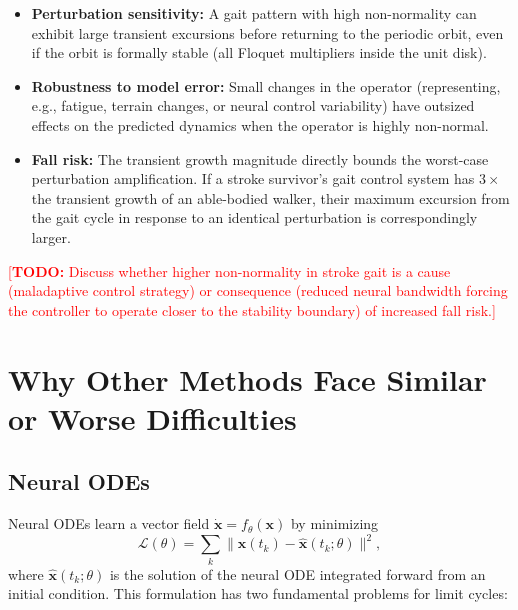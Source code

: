 \documentclass[12pt]{article}
\newcommand{\norm}[1]{\lVert #1 \rVert}
\newcommand{\todo}[1]{\textcolor{red}{[\textbf{TODO:} #1]}}
\begin{document}
\begin{itemize}
  \item \textbf{Perturbation sensitivity:} A gait pattern with high
  non-normality can exhibit large transient excursions before returning
  to the periodic orbit, even if the orbit is formally stable (all
  Floquet multipliers inside the unit disk).
  \item \textbf{Robustness to model error:} Small changes in the operator
  (representing, e.g., fatigue, terrain changes, or neural control
  variability) have outsized effects on the predicted dynamics when the
  operator is highly non-normal.
  \item \textbf{Fall risk:} The transient growth magnitude directly
  bounds the worst-case perturbation amplification. If a stroke
  survivor's gait control system has $3\times$ the transient growth
  of an able-bodied walker, their maximum excursion from the gait
  cycle in response to an identical perturbation is correspondingly
  larger.
\end{itemize}

\todo{Discuss whether higher non-normality in stroke gait is a cause
(maladaptive control strategy) or consequence (reduced neural bandwidth
forcing the controller to operate closer to the stability boundary) of
increased fall risk.}

\section{Why Other Methods Face Similar or Worse Difficulties}
\label{sec:alternatives}

\subsection{Neural ODEs}
\label{sec:neural_odes}

Neural ODEs learn a vector field $\dot{\bm{x}} = f_\theta(\bm{x})$ by
minimizing
\begin{equation}
  \mathcal{L}(\theta) = \sum_k \norm{\bm{x}(t_k) - \hat{\bm{x}}(t_k;\theta)}^2,
  \label{eq:node_loss}
\end{equation}
where $\hat{\bm{x}}(t_k;\theta)$ is the solution of the neural ODE
integrated forward from an initial condition. This formulation has two
fundamental problems for limit cycles:
\end{document}
